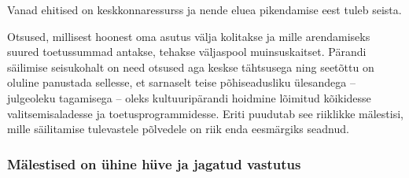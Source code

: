 \documentclass[estonian,]{article}
\begin{document}
\begin{blockquote-right}
Vanad ehitised on keskkonnaressurss ja nende eluea pikendamise eest
tuleb seista.
\end{blockquote-right}

Otsused, millisest hoonest oma asutus välja kolitakse ja mille arendamiseks suured toetussummad antakse, tehakse väljaspool muinsuskaitset. Pärandi säilimise seisukohalt on need otsused aga keskse tähtsusega ning seetõttu on oluline panustada sellesse, et sarnaselt teise põhiseadusliku ülesandega -- julgeoleku tagamisega -- oleks kultuuripärandi hoidmine lõimitud kõikidesse valitsemisaladesse ja toetusprogrammidesse. Eriti puudutab see riiklikke mälestisi, mille säilitamise tulevastele põlvedele on riik enda eesmärgiks seadnud.

\hypertarget{muxe4lestised-on-uxfchine-huxfcve-ja-jagatud-vastutus}{%
\subsubsection*{Mälestised on ühine hüve ja jagatud vastutus}\label{muxe4lestised-on-uxfchine-huxfcve-ja-jagatud-vastutus}}
\end{document}
